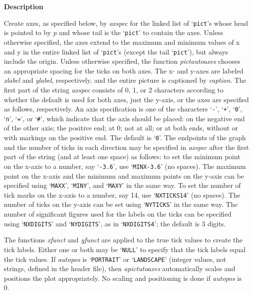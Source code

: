 \documentclass{book}
\newcommand\Texinfocommandstyletextvar[1]{{\normalfont{}\textsl{#1}}}%
\renewcommand{\_}{\Texinfounderscore\discretionary{}{}{}}
\begin{document}
\noindent{}\textbf{Description}

Create axes, as specified below, by
\Texinfocommandstyletextvar{axspec} for the linked list of `\texttt{pict}'s whose head
is pointed to by \Texinfocommandstyletextvar{p} and whose tail is the `\texttt{pict}' to contain the axes.
Unless otherwise specified,
the axes extend to the maximum and minimum values of
x and y in the entire linked list of `\texttt{pict}'s (except the tail `\texttt{pict}'),
but always include the origin.
Unless otherwise specified,
the function \Texinfocommandstyletextvar{pict\_autoaxes} chooses an appropriate spacing for the ticks on both axes.
The x- and y-axes are labeled \Texinfocommandstyletextvar{xlabel} and \Texinfocommandstyletextvar{ylabel},
respectively, and the entire picture is captioned by \Texinfocommandstyletextvar{caption}.
The first part of the
string \Texinfocommandstyletextvar{axspec} consists of 0, 1, or 2 characters according to whether the default
is used for both axes, just the y-axis, or the axes are specified
as follows, respectively.
An axis specification is one of the characters
`\texttt{-}', `\texttt{+}', `\texttt{0}', `\texttt{n}', `\texttt{=}',  or `\texttt{\#}',
which indicate that the axis should be placed: on the negative end of the other
axis; the positive end; at 0; not at all; or at both ends,
without or with markings on the positive end.
The default is `\texttt{0}'.
The endpoints of the graph and the number of ticks in each direction may be specified
in \Texinfocommandstyletextvar{axspec} after the first part of the string
(and at least one space) as follows:
to set the minimum point on the x-axis to a number, say `\texttt{-3.6}', use
`\texttt{MINX-3.6}' (no spaces). The maximum point on the x-axis and the minimum
and maximum points on the y-axis can be specified using `\texttt{MAXX}',
`\texttt{MINY}', and `\texttt{MAXY}' in the same way. To set the number of tick marks
on the x-axis to a number, say 14, use `\texttt{NXTICKS14}' (no spaces).
The number of ticks on the y-axis can be set using `\texttt{NYTICKS}' in the
same way.
The number of significant figures used for the labels on the ticks can
be specified using `\texttt{NXDIGITS}' and `\texttt{NYDIGITS}', as in
`\texttt{NXDIGITS4}'; the default is 3 digits.

The functions \Texinfocommandstyletextvar{xfunct} and \Texinfocommandstyletextvar{yfunct}
are applied to the true tick values to create the tick labels.
Either one or both may be `\texttt{NULL}' to specify that the tick labels equal the tick values.
If \Texinfocommandstyletextvar{autopos} is `\texttt{PORTRAIT}' or `\texttt{LANDSCAPE}' (integer
values, not strings, defined in the header file), then
\Texinfocommandstyletextvar{apict\_utoaxes} automatically scales and positions the plot appropriately.
No scaling and positioning is done if
\Texinfocommandstyletextvar{autopos} is 0.
\end{document}
